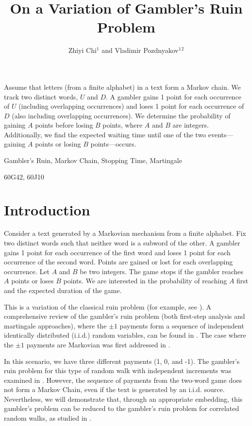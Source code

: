 \documentclass{amsart}
\title{On a Variation of Gambler's Ruin Problem}
\author{Zhiyi Chi$^1$ and Vladimir Pozdnyakov$^1$$^2$}
\date{}
\newcommand{\1}{{\mathbf{1}}}
\begin{document}
\maketitle

\doublespacing


{
Assume that letters (from a finite alphabet) in a text form a Markov chain. We track two distinct words, $U$ and $D$.
A gambler gains 1 point for each occurrence of $U$ (including overlapping occurrences) and loses 1 point for each
occurrence of $D$ (also including overlapping occurrences). We determine the probability of gaining $A$ points before
losing $B$ points, where $A$ and $B$ are integers. Additionally, we find the expected waiting time until one of the two
events---gaining $A$ points or losing $B$ points---occurs.


\medskip
{} Gambler's Ruin, Markov Chain, Stopping Time, Martingale

\medskip
{} 60G42, 60J10
}

\section{Introduction}
Consider a text generated by a Markovian mechanism from a finite alphabet.
Fix two distinct words such that neither word is a subword of the other. A gambler gains 1 point for each
occurrence of the first word and loses 1 point for each occurrence of the second word.
Points are gained or lost for each overlapping occurrence. Let $A$ and $B$ be two integers.
The game stops if the gambler reaches $A$ points or loses $B$ points. We are interested in
the probability of reaching $A$ first and the expected duration of the game.

This is a variation of the classical ruin problem (for example, see \cite{Feller1968}).
A comprehensive review of the gambler's ruin problem (both first-step analysis and martingale
approaches), where the $\pm 1$ payments form a sequence of independent identically distributed
(i.i.d.) random variables, can be found in \cite{Steele2001}.
The case where the $\pm 1$ payments are Markovian was first addressed in \cite{Mohan1955}.

In this scenario, we have three different payments (1, 0, and -1).  The gambler's ruin problem
for this type of random walk with independent increments was examined in \cite{Gut2013}.
However, the sequence of payments from the two-word game does not form a Markov Chain,
even if the text is generated by an i.i.d. source. Nevertheless, we will demonstrate that,
through an appropriate embedding, this gambler's problem can be reduced to the gambler's ruin
problem for correlated random walks, as studied in \cite{Mohan1955}.
\end{document}
